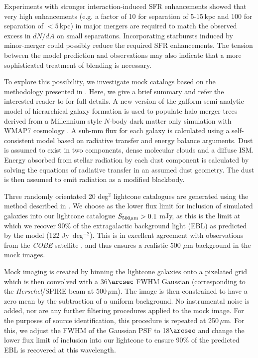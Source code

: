 \documentclass[iop]{emulateapj}
\begin{document}
Experiments with stronger interaction-induced SFR enhancements showed that very
high enhancements (e.g. a factor of 10 for separation of 5-15$\,$kpc and 100 for
separation of $<5\,$kpc) in major mergers are required to match the observed
excess in $dN/dA$ on small separations. Incorporating starbursts induced by
minor-merger could possibly reduce the required SFR enhancements. The tension
between the model prediction and observations may also indicate that a more
sophisticated treatment of blending is necessary.

To explore this possibility, we investigate mock catalogs based on the
methodology presented in \citet{Cowley:2015lr}.  Here, we give a brief summary
and refer the interested reader to \citet{Cowley:2015lr} for full details. A
new version of the {\sc galform} \citep[e.g.][Lacey et al. in
preparation]{Cole:2000fk} semi-analytic model of hierarchical galaxy formation
is used to populate halo merger trees \citep[e.g.][]{Parkinson:2008qy,
Jiang:2014lr} derived from a Millennium style $N$-body dark matter only
simulation \citep{Springel:2005lr, Guo:2013lr} with WMAP7 cosmology
\citep{Komatsu:2011fk}.  A sub-mm flux for each galaxy is calculated using a
self-consistent model based on radiative transfer and energy balance arguments.
Dust is assumed to exist in two components,  dense molecular clouds and a
diffuse ISM.  Energy absorbed from stellar radiation by each dust component is
calculated by solving the equations of radiative transfer in an assumed dust
geometry.  The dust is then assumed to emit radiation as a modified blackbody.  

Three randomly orientated 20 deg$^2$ lightcone catalogues are generated using
the method described in \citet{Merson:2013lr}.  We choose as the lower flux
limit for inclusion of simulated galaxies into our lightcone catalogue
$S_{500\mu\rm{m}}>0.1$ mJy, as this is the limit at which we recover 90\% of
the extragalactic background light (EBL) as predicted by the model (122
Jy~deg$^{-2}$). This is in excellent agreement with observations from the
\emph{COBE} satellite \citep[e.g.,][]{Puget:1996lr}, and thus ensures a
realistic 500 $\mu$m  background in the mock images.  

Mock imaging is created by binning the lightcone galaxies onto a pixelated grid
which is then convolved with a 36$\arcsec$ FWHM Gaussian (corresponding to the
\emph{Herschel}/SPIRE beam at 500$\,\mu$m).  The image is then constrained to
have a zero mean by the subtraction of a uniform background.  No instrumental
noise is added, nor are any further filtering procedures applied to the mock
image.  For the purposes of source identification, this procedure is repeated
at 250$\,\mu$m.  For this, we adjust the FWHM of the Gaussian PSF to
18$\arcsec$ and change the lower flux limit of inclusion into our lightcone to
ensure 90\% of the predicted EBL is recovered at this wavelength.    
\end{document}
